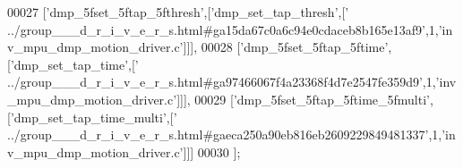 \begin{DoxyCode}
00027   [\textcolor{stringliteral}{'dmp\_5fset\_5ftap\_5fthresh'},[\textcolor{stringliteral}{'dmp\_set\_tap\_thresh'},[\textcolor{stringliteral}{'
      ../group\_\_\_d\_r\_i\_v\_e\_r\_s.html#ga15da67c0a6c94e0cdaceb8b165e13af9'},1,\textcolor{stringliteral}{'inv\_mpu\_dmp\_motion\_driver.c'}]]],
00028   [\textcolor{stringliteral}{'dmp\_5fset\_5ftap\_5ftime'},[\textcolor{stringliteral}{'dmp\_set\_tap\_time'},[\textcolor{stringliteral}{'
      ../group\_\_\_d\_r\_i\_v\_e\_r\_s.html#ga97466067f4a23368f4d7e2547fe359d9'},1,\textcolor{stringliteral}{'inv\_mpu\_dmp\_motion\_driver.c'}]]],
00029   [\textcolor{stringliteral}{'dmp\_5fset\_5ftap\_5ftime\_5fmulti'},[\textcolor{stringliteral}{'dmp\_set\_tap\_time\_multi'},[\textcolor{stringliteral}{'
      ../group\_\_\_d\_r\_i\_v\_e\_r\_s.html#gaeca250a90eb816eb2609229849481337'},1,\textcolor{stringliteral}{'inv\_mpu\_dmp\_motion\_driver.c'}]]]
00030 ];
\end{DoxyCode}
